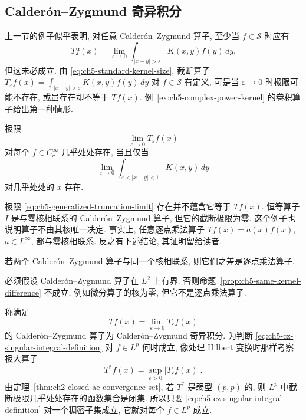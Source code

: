 \hypertarget{chapter-05-page-113}{}
\subsection{Calderón--Zygmund 奇异积分}
\label{sec:ch5-calderon-zygmund-singular-integrals}

上一节的例子似乎表明, 对任意 Calderón--Zygmund 算子, 至少当 $f\in\mathcal S$ 时应有
\[
 Tf(x)=\lim_{\varepsilon\to0}\int_{|x-y|>\varepsilon}K(x,y)f(y)\,dy.
\]
但这未必成立. 由 \eqref{eq:ch5-standard-kernel-size}, 截断算子 $T_\varepsilon f(x)=\int_{|x-y|>\varepsilon}K(x,y)f(y)\,dy$ 对 $f\in\mathcal S$ 有定义, 可是当 $\varepsilon\to0$ 时极限可能不存在, 或虽存在却不等于 $Tf(x)$. 例~\ref{ex:ch5-complex-power-kernel} 的卷积算子给出第一种情形.

\begin{Proposition}
\label{prop:ch5-truncation-existence-criterion}
极限
\begin{equation}
\label{eq:ch5-generalized-truncation-limit}
 \lim_{\varepsilon\to0}T_\varepsilon f(x)
\end{equation}
对每个 $f\in C_c^\infty$ 几乎处处存在, 当且仅当
\[
 \lim_{\varepsilon\to0}\int_{\varepsilon<|x-y|<1}K(x,y)\,dy
\]
对几乎处处的 $x$ 存在.
\end{Proposition}

极限 \eqref{eq:ch5-generalized-truncation-limit} 存在并不蕴含它等于 $Tf(x)$. 恒等算子 $I$ 是与零核相联系的 Calderón--Zygmund 算子, 但它的截断极限为零. 这个例子也说明算子不由其核唯一决定. 事实上, 任意逐点乘法算子 $Tf(x)=a(x)f(x)$, $a\in L^\infty$, 都与零核相联系. 反之有下述结论, 其证明留给读者.

\begin{Proposition}
\label{prop:ch5-same-kernel-difference}
若两个 Calderón--Zygmund 算子与同一个核相联系, 则它们之差是逐点乘法算子.
\end{Proposition}

必须假设 Calderón--Zygmund 算子在 $L^2$ 上有界. 否则命题~\ref{prop:ch5-same-kernel-difference} 不成立, 例如微分算子的核为零, 但它不是逐点乘法算子.

\hypertarget{chapter-05-page-114}{}
称满足
\begin{equation}
\label{eq:ch5-cz-singular-integral-definition}
 Tf(x)=\lim_{\varepsilon\to0}T_\varepsilon f(x)
\end{equation}
的 Calderón--Zygmund 算子为 Calderón--Zygmund 奇异积分. 为判断 \eqref{eq:ch5-cz-singular-integral-definition} 对 $f\in L^p$ 何时成立, 像处理 Hilbert 变换时那样考察极大算子
\[
 T^*f(x)=\sup_{\varepsilon>0}|T_\varepsilon f(x)|.
\]
由定理~\ref{thm:ch2-closed-ae-convergence-set}, 若 $T^*$ 是弱型 $(p,p)$ 的, 则 $L^p$ 中截断极限几乎处处存在的函数集合是闭集. 所以只要 \eqref{eq:ch5-cz-singular-integral-definition} 对一个稠密子集成立, 它就对每个 $f\in L^p$ 成立.

